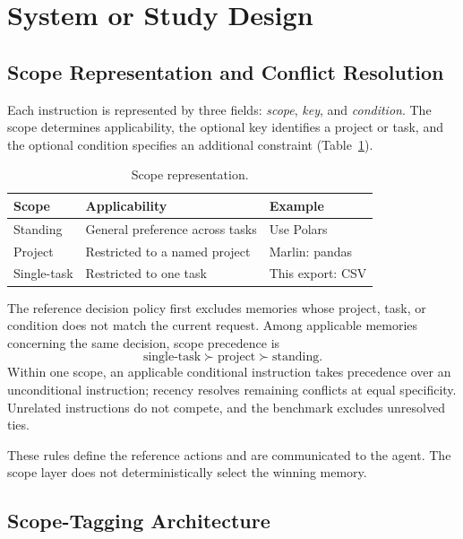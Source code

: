 \section{System or Study Design}
\label{sec:methodology}

\subsection{Scope Representation and Conflict Resolution}
\label{sec:scope-representation}

Each instruction is represented by three fields:
\emph{scope}, \emph{key}, and \emph{condition}.
The scope determines applicability, the optional key identifies
a project or task, and the optional condition specifies an
additional constraint (Table~\ref{tab:scopes}).

\begin{table}[t]
\centering
\small
\caption{Scope representation.}
\label{tab:scopes}
\begin{tabularx}{\linewidth}{lXl}
\toprule
Scope & Applicability & Example \\
\midrule
Standing & General preference across tasks &
Use Polars \\
Project & Restricted to a named project &
Marlin: pandas \\
Single-task & Restricted to one task &
This export: CSV \\
\bottomrule
\end{tabularx}
\end{table}

The reference decision policy first excludes memories whose
project, task, or condition does not match the current request.
Among applicable memories concerning the same decision, scope
precedence is
\[
\text{single-task} \succ \text{project}
\succ \text{standing}.
\]
Within one scope, an applicable conditional instruction takes
precedence over an unconditional instruction; recency resolves
remaining conflicts at equal specificity. Unrelated instructions
do not compete, and the benchmark excludes unresolved ties.

These rules define the reference actions and are communicated
to the agent. The scope layer does not deterministically
select the winning memory.

\subsection{Scope-Tagging Architecture}
\label{sec:architecture}

